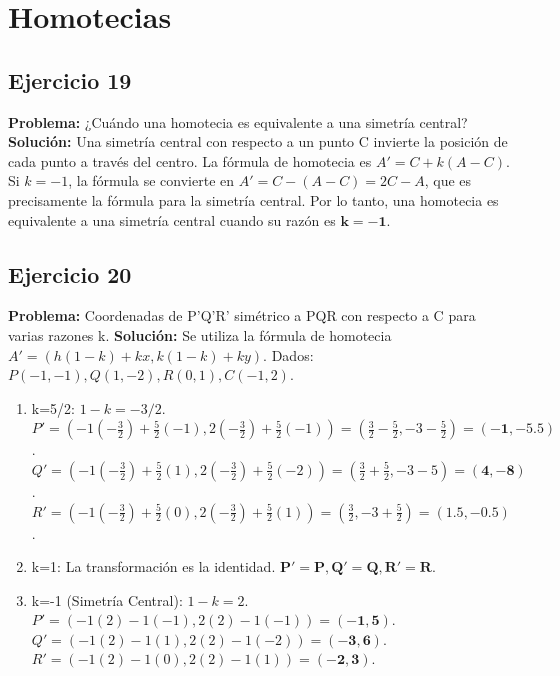\documentclass[12pt, letterpaper]{article}
\begin{document}
\newpage
\section{Homotecias}

\subsection{Ejercicio 19}
\textbf{Problema:} ¿Cuándo una homotecia es equivalente a una simetría central?
\textbf{Solución:} Una simetría central con respecto a un punto C invierte la posición de cada punto a través del centro. La fórmula de homotecia es $A' = C + k(A-C)$. Si $k=-1$, la fórmula se convierte en $A' = C - (A-C) = 2C - A$, que es precisamente la fórmula para la simetría central. Por lo tanto, una homotecia es equivalente a una simetría central cuando su razón es $\mathbf{k=-1}$.

\subsection{Ejercicio 20}
\textbf{Problema:} Coordenadas de P'Q'R' simétrico a PQR con respecto a C para varias razones k.
\textbf{Solución:} Se utiliza la fórmula de homotecia $A' = (h(1-k)+kx, k(1-k)+ky)$.
Dados: $P(-1,-1), Q(1,-2), R(0,1), C(-1,2)$.
\begin{enumerate}[label=\alph*)]
    \item k=5/2: $1-k = -3/2$.
    $P' = (-1(-\frac{3}{2}) + \frac{5}{2}(-1), 2(-\frac{3}{2}) + \frac{5}{2}(-1)) = (\frac{3}{2}-\frac{5}{2}, -3-\frac{5}{2}) = \mathbf{(-1, -5.5)}$.
    $Q' = (-1(-\frac{3}{2}) + \frac{5}{2}(1), 2(-\frac{3}{2}) + \frac{5}{2}(-2)) = (\frac{3}{2}+\frac{5}{2}, -3-5) = \mathbf{(4, -8)}$.
    $R' = (-1(-\frac{3}{2}) + \frac{5}{2}(0), 2(-\frac{3}{2}) + \frac{5}{2}(1)) = (\frac{3}{2}, -3+\frac{5}{2}) = \mathbf{(1.5, -0.5)}$.
    \item k=1: La transformación es la identidad. $\mathbf{P'=P, Q'=Q, R'=R}$.
    \item k=-1 (Simetría Central): $1-k = 2$.
    $P' = (-1(2) - 1(-1), 2(2) - 1(-1)) = \mathbf{(-1,5)}$.
    $Q' = (-1(2) - 1(1), 2(2) - 1(-2)) = \mathbf{(-3,6)}$.
    $R' = (-1(2) - 1(0), 2(2) - 1(1)) = \mathbf{(-2,3)}$.
\end{enumerate}
\end{document}
